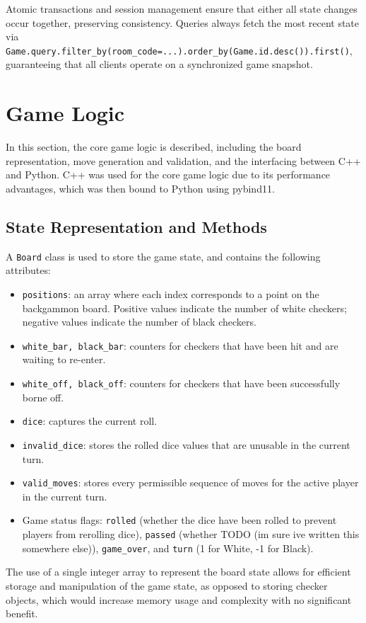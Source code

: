 Atomic transactions and session management ensure that either all state changes occur together, preserving consistency. Queries always fetch the most recent state via
\texttt{Game.query.filter\_by(room\_code=...).order\_by(Game.id.desc()).first()}, guaranteeing that all clients operate on a synchronized game snapshot.

\section{Game Logic}
In this section, the core game logic is described, including the board representation, move generation and validation, and the interfacing between C++ and Python. C++ was used for the core game logic due to its performance advantages, which was then bound to Python using pybind11. 
\subsection{State Representation and Methods}
A \texttt{Board} class is used to store the game state, and contains the following attributes:
\begin{itemize}
\item \texttt{positions}: an array where each index corresponds to a point on the backgammon board. Positive values indicate the number of white checkers; negative values indicate the number of black checkers.
\item \texttt{white\_bar, black\_bar}: counters for checkers that have been hit and are waiting to re-enter.
\item \texttt{white\_off, black\_off}: counters for checkers that have been successfully borne off.
\item \texttt{dice}: captures the current roll.
\item \texttt{invalid\_dice}: stores the rolled dice values that are unusable in the current turn.
\item \texttt{valid\_moves}: stores every permissible sequence of moves for the active player in the current turn.
\item Game status flags: \texttt{rolled} (whether the dice have been rolled to prevent players from rerolling dice), \texttt{passed} (whether TODO (im sure ive written this somewhere else)), \texttt{game\_over}, and \texttt{turn} (1 for White, -1 for Black).
\end{itemize}
The use of a single integer array to represent the board state allows for efficient storage and manipulation of the game state, as opposed to storing checker objects, which would increase memory usage and complexity with no significant benefit.

